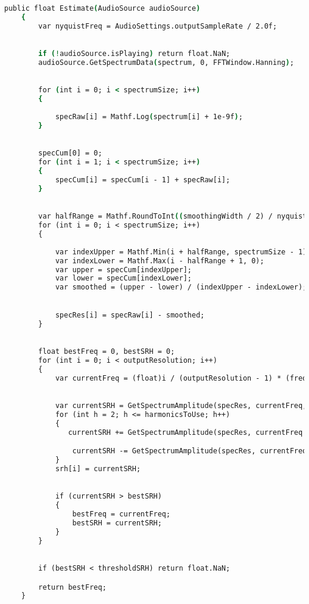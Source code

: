 \begin{lstlisting}[language=csh,caption=Funkcja \texttt{Estimate}, label=lst:1]
    public float Estimate(AudioSource audioSource)
    {
        var nyquistFreq = AudioSettings.outputSampleRate / 2.0f;

    
        if (!audioSource.isPlaying) return float.NaN;
        audioSource.GetSpectrumData(spectrum, 0, FFTWindow.Hanning);

   
        for (int i = 0; i < spectrumSize; i++)
        {
           
            specRaw[i] = Mathf.Log(spectrum[i] + 1e-9f);
        }

       
        specCum[0] = 0;
        for (int i = 1; i < spectrumSize; i++)
        {
            specCum[i] = specCum[i - 1] + specRaw[i];
        }

   
        var halfRange = Mathf.RoundToInt((smoothingWidth / 2) / nyquistFreq * spectrumSize);
        for (int i = 0; i < spectrumSize; i++)
        {
        
            var indexUpper = Mathf.Min(i + halfRange, spectrumSize - 1);
            var indexLower = Mathf.Max(i - halfRange + 1, 0);
            var upper = specCum[indexUpper];
            var lower = specCum[indexLower];
            var smoothed = (upper - lower) / (indexUpper - indexLower);

            
            specRes[i] = specRaw[i] - smoothed;
        }

       
        float bestFreq = 0, bestSRH = 0;
        for (int i = 0; i < outputResolution; i++)
        {
            var currentFreq = (float)i / (outputResolution - 1) * (frequencyMax - frequencyMin) + frequencyMin;

           
            var currentSRH = GetSpectrumAmplitude(specRes, currentFreq, nyquistFreq);
            for (int h = 2; h <= harmonicsToUse; h++)
            {
               currentSRH += GetSpectrumAmplitude(specRes, currentFreq * h, nyquistFreq);

                currentSRH -= GetSpectrumAmplitude(specRes, currentFreq * (h - 0.5f), nyquistFreq);
            }
            srh[i] = currentSRH;

           
            if (currentSRH > bestSRH)
            {
                bestFreq = currentFreq;
                bestSRH = currentSRH;
            }
        }

        
        if (bestSRH < thresholdSRH) return float.NaN;

        return bestFreq;
    }
\end{lstlisting}

